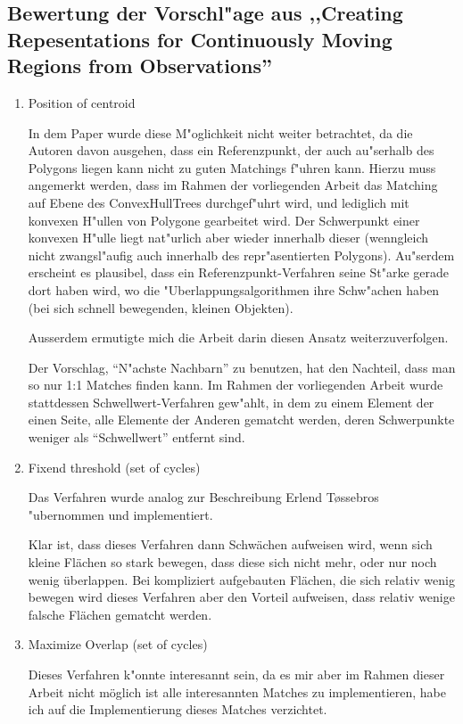 \subsection{Bewertung der Vorschl"age aus ,,Creating Repesentations for Continuously Moving Regions from Observations''\cite{TG}}
\begin{enumerate}
\item Position of centroid

In dem Paper wurde diese M"oglichkeit nicht weiter betrachtet, da die Autoren davon ausgehen, dass ein Referenzpunkt, der auch au"serhalb des Polygons liegen kann nicht zu guten Matchings f"uhren kann. Hierzu muss angemerkt werden, dass im Rahmen der vorliegenden Arbeit das Matching auf Ebene des ConvexHullTrees durchgef"uhrt wird, und lediglich mit konvexen H"ullen von Polygone gearbeitet wird. Der Schwerpunkt einer konvexen H"ulle liegt nat"urlich aber wieder innerhalb dieser (wenngleich nicht zwangsl"aufig auch innerhalb des repr"asentierten Polygons). Au"serdem erscheint es plausibel, dass ein Referenzpunkt-Verfahren seine St"arke gerade dort haben wird, wo die "Uberlappungsalgorithmen ihre Schw"achen haben (bei sich schnell bewegenden, kleinen Objekten).

Ausserdem ermutigte mich die Arbeit \cite{AFRW} darin diesen Ansatz weiterzuverfolgen.

Der Vorschlag, "`N"achste Nachbarn"' zu benutzen, hat den Nachteil, dass man so nur 1:1 Matches finden kann. Im Rahmen der vorliegenden Arbeit wurde stattdessen Schwellwert-Verfahren gew"ahlt, in dem zu einem Element der einen Seite, alle Elemente der Anderen gematcht werden, deren Schwerpunkte weniger als "`Schwellwert"' entfernt sind. 

\item Fixend threshold (set of cycles)

Das Verfahren wurde analog zur Beschreibung Erlend T\o{}ssebros "ubernommen und implementiert. 

Klar ist, dass dieses Verfahren dann Schwächen aufweisen wird, wenn sich kleine Flächen so stark bewegen, dass diese sich nicht mehr, oder nur noch wenig überlappen. Bei kompliziert aufgebauten Flächen, die sich relativ wenig bewegen wird dieses Verfahren aber den Vorteil aufweisen, dass relativ wenige falsche Flächen gematcht werden.

\item Maximize Overlap (set of cycles)

Dieses Verfahren k"onnte interesannt sein, da es mir aber im  Rahmen dieser Arbeit nicht möglich ist alle interesannten Matches zu implementieren, habe ich auf die Implementierung dieses Matches verzichtet.

\end{enumerate}

